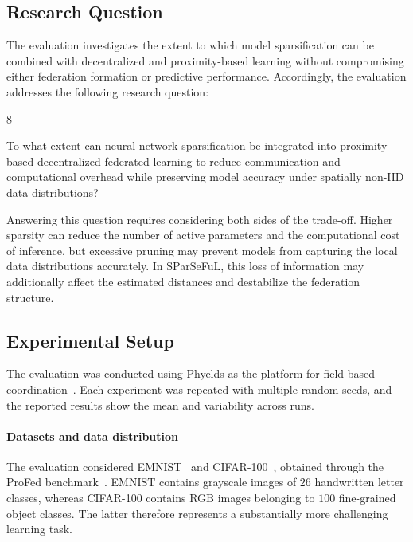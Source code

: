 \subsection{Research Question}
\label{sec:sparseful-rq}

The evaluation investigates the extent to which model sparsification can be
 combined with decentralized and proximity-based learning without compromising
 either federation formation or predictive performance.
%
Accordingly, 
 the evaluation addresses the following research question:

\begin{chapRQ}{8}
  \item
  To what extent can neural network sparsification be integrated into
  proximity-based decentralized federated learning to reduce communication
  and computational overhead while preserving model accuracy under spatially
  non-IID data distributions?
  \label{rq:sparseful}
\end{chapRQ}

Answering this question requires considering both sides of the trade-off.
%
Higher sparsity can reduce the number of active parameters 
 and the computational cost of inference, 
 but excessive pruning may prevent models from
 capturing the local data distributions accurately.
%
In SParSeFuL, 
 this loss of information may additionally affect the estimated
 distances and destabilize the federation structure.

\subsection{Experimental Setup}
\label{sec:sparseful-setup}

The evaluation was conducted using Phyelds as the platform for field-based
 coordination~\cite{DBLP:conf/coordination/AguzziDFV26}.
%
Each experiment was repeated with multiple random seeds, 
 and the reported results show the mean and variability across runs.

\paragraph{Datasets and data distribution}

The evaluation considered EMNIST~\cite{DBLP:journals/corr/CohenATS17} and
 CIFAR-100~\cite{krizhevsky2009learning}, obtained through the
 ProFed benchmark~\cite{DBLP:journals/jors/DominiIALV26}.
%
EMNIST contains grayscale images of \(26\) handwritten letter classes, 
 whereas CIFAR-100 contains RGB images belonging to \(100\) fine-grained object classes.
%
The latter therefore represents a substantially more challenging learning task.

